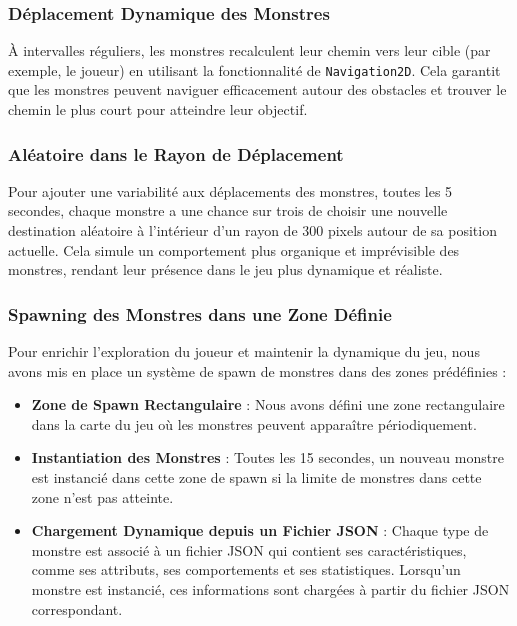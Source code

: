 \subsubsection{Déplacement Dynamique des Monstres}

À intervalles réguliers, les monstres recalculent leur chemin vers leur cible (par exemple, le joueur) en utilisant la fonctionnalité
de \texttt{Navigation2D}. Cela garantit que les monstres peuvent naviguer efficacement autour des obstacles et trouver le chemin le plus court pour atteindre leur objectif.

\subsubsection{Aléatoire dans le Rayon de Déplacement}

Pour ajouter une variabilité aux déplacements des monstres, toutes les 5 secondes, chaque monstre a une chance sur trois de choisir une nouvelle destination aléatoire à l'intérieur d'un rayon de 300 pixels autour de sa position actuelle. 
Cela simule un comportement plus organique et imprévisible des monstres, rendant leur présence dans le jeu plus dynamique et réaliste.

\subsubsection{Spawning des Monstres dans une Zone Définie}

Pour enrichir l'exploration du joueur et maintenir la dynamique du jeu, nous avons mis en place un système de spawn de monstres dans des zones prédéfinies :
\\

\begin{itemize}
      \item \textbf{Zone de Spawn Rectangulaire} : Nous avons défini une zone rectangulaire dans la carte du jeu où les monstres peuvent apparaître périodiquement.
            \\

      \item \textbf{Instantiation des Monstres} : Toutes les 15 secondes, un nouveau monstre est instancié dans cette zone de spawn si la limite de monstres dans
            cette zone n'est pas atteinte.
            \\

      \item \textbf{Chargement Dynamique depuis un Fichier JSON} : Chaque type de monstre est associé à un fichier
            JSON qui contient ses caractéristiques, comme ses attributs, ses comportements et ses statistiques. Lorsqu'un monstre est instancié,
            ces informations sont chargées à partir du fichier JSON correspondant.
\end{itemize}

